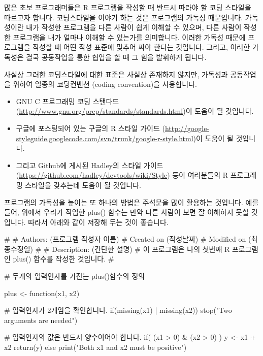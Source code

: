 많은 초보 프로그래머들은 R 프로그램을 작성할 때 반드시 따라야 할 코딩 스타일을 따르고자 합니다.
코딩스타일을 이야기 하는 것은 프로그램의 가독성 때문입니다. 
가독성이란 내가 작성한 프로그램을 다른 사람이 쉽게 이해할 수 있으며, 다른 사람이 작성한 프로그램을 내가 얼마나 이해할 수 있는가를 의미합니다.
이러한 가독성 때문에 프로그램을 작성할 때 어떤 작성 표준에 맞추어 짜야 한다는 것입니다.
그리고, 이러한 가독성은 결국 공동작업을 통한 협업을 할 때 그 힘을 발휘하게 됩니다. 

사실상 그러한 코딩스타일에 대한 표준은 사실상 존재하지 않지만, 가독성과 공동작업을 위하여 일종의 코딩컨벤션 (coding convention)을 사용합니다. 
\begin{itemize}
\item GNU C 프로그래밍 코딩 스탠다드 (\url{http://www.gnu.org/prep/standards/standards.html})이 도움이 될 것입니다. 
\item 구글에 포스팅되어 있는 구글의 R 스타일 가이드 (\url{http://google-styleguide.googlecode.com/svn/trunk/google-r-style.html})이 도움이 될 것입니다. 
\item 그리고 Github에 게시된 Hadley의 스타일 가이드 (\url{https://github.com/hadley/devtools/wiki/Style}) 등이 여러분들의 R 프로그래밍 스타일을 갖추는데 도움이 될 것입니다. 
\end{itemize}

프로그램의 가독성을 높이는 또 하나의 방법은 주석문을 많이 활용하는 것입니다.
예를들어, 위에서 우리가 작업한 plus() 함수는 만약 다른 사람이 보면 잘 이해하지 못할 것입니다. 
따라서 아래와 같이 저장해 두는 것이 좋습니다.

\begin{Schunk}
\begin{Soutput}
# 
# Authors: (프로그램 작성자 이름)
# Created on (작성날짜) 
# Modified on (최종수정일)
# 
# Description: (간단한 설명)
# 이 프로그램은 나의 첫번째 R 프로그램인 plus() 함수를 작성한 것입니다.
# 

# 두개의 입력인자를 가진는 plus()함수의 정의 

plus <- function(x1, x2){

	# 입력인자가 2개임을 확인합니다.
	if(missing(x1) | missing(x2)) stop("Two arguments are needed")
	
	# 입력인자의 값은 반드시 양수이어야 합니다. 
	if( (x1 > 0) & (x2 > 0) ){
		y <- x1 + x2
		return(y)
	}
	else print("Both x1 and x2 must be positive")
}
\end{Soutput}
\end{Schunk}




